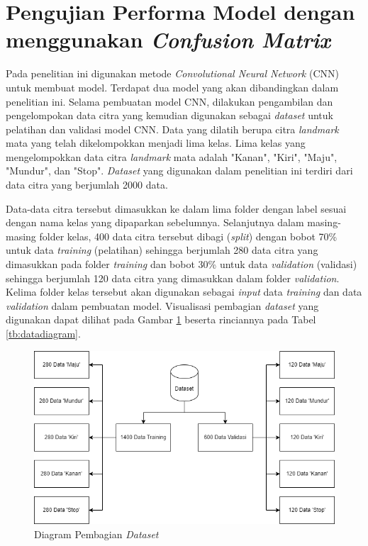 \section{Pengujian Performa Model dengan menggunakan \emph{Confusion Matrix}}

Pada penelitian ini digunakan metode \emph{Convolutional Neural Network} (CNN) untuk membuat model. Terdapat dua model yang akan dibandingkan dalam penelitian ini. Selama pembuatan model CNN, dilakukan pengambilan dan pengelompokan data citra yang kemudian digunakan sebagai \emph{dataset} untuk pelatihan dan validasi model CNN. Data yang dilatih berupa citra \emph{landmark} mata yang telah dikelompokkan menjadi lima kelas. Lima kelas yang mengelompokkan data citra \emph{landmark} mata adalah "Kanan", "Kiri", "Maju", "Mundur", dan "Stop". \emph{Dataset} yang digunakan dalam penelitian ini terdiri dari data citra yang berjumlah 2000 data. 

Data-data citra tersebut dimasukkan ke dalam lima folder dengan label sesuai dengan nama kelas yang dipaparkan sebelumnya. Selanjutnya dalam masing-masing folder kelas, 400 data citra tersebut dibagi (\emph{split}) dengan bobot 70\% untuk data \emph{training} (pelatihan) sehingga berjumlah 280 data citra yang dimasukkan pada folder \emph{training }dan bobot 30\% untuk data \emph{validation} (validasi) sehingga berjumlah 120 data citra yang dimasukkan dalam folder \emph{validation}. Kelima folder kelas tersebut akan digunakan sebagai \emph{input} data \emph{training} dan data \emph{validation} dalam pembuatan model. Visualisasi pembagian \emph{dataset} yang digunakan dapat dilihat pada Gambar \ref{fig:dataset} beserta rinciannya pada Tabel \ref{tb:datadiagram}.

\begin{figure} [H] \centering
  \includegraphics[width=1\textwidth]{gambar/bab4/visualdataset.png}
  \caption{Diagram Pembagian \emph{Dataset}}
  \label{fig:dataset}
\end{figure}

